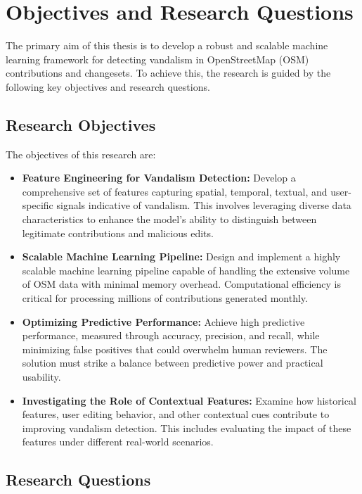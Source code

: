 \documentclass[
    13pt, %
    a4paper, %
    listof=totoc, %
    bibliography=totoc, %
    index=totoc, %
    headsepline
]{scrreprt}
\begin{document}
\section{Objectives and Research Questions}
\label{objectives_and_research_questions}

The primary aim of this thesis is to develop a robust and scalable machine learning framework for detecting vandalism in OpenStreetMap (OSM) contributions and changesets. To achieve this, the research is guided by the following key objectives and research questions.

\subsection{Research Objectives}

The objectives of this research are:

\begin{itemize}
  \item \textbf{Feature Engineering for Vandalism Detection:} Develop a comprehensive set of features capturing spatial, temporal, textual, and user-specific signals indicative of vandalism. This involves leveraging diverse data characteristics to enhance the model’s ability to distinguish between legitimate contributions and malicious edits.

  \item \textbf{Scalable Machine Learning Pipeline:} Design and implement a highly scalable machine learning pipeline capable of handling the extensive volume of OSM data with minimal memory overhead. Computational efficiency is critical for processing millions of contributions generated monthly.

  \item \textbf{Optimizing Predictive Performance:} Achieve high predictive performance, measured through accuracy, precision, and recall, while minimizing false positives that could overwhelm human reviewers. The solution must strike a balance between predictive power and practical usability.

  \item \textbf{Investigating the Role of Contextual Features:} Examine how historical features, user editing behavior, and other contextual cues contribute to improving vandalism detection. This includes evaluating the impact of these features under different real-world scenarios.
\end{itemize}

\subsection{Research Questions}
\end{document}
